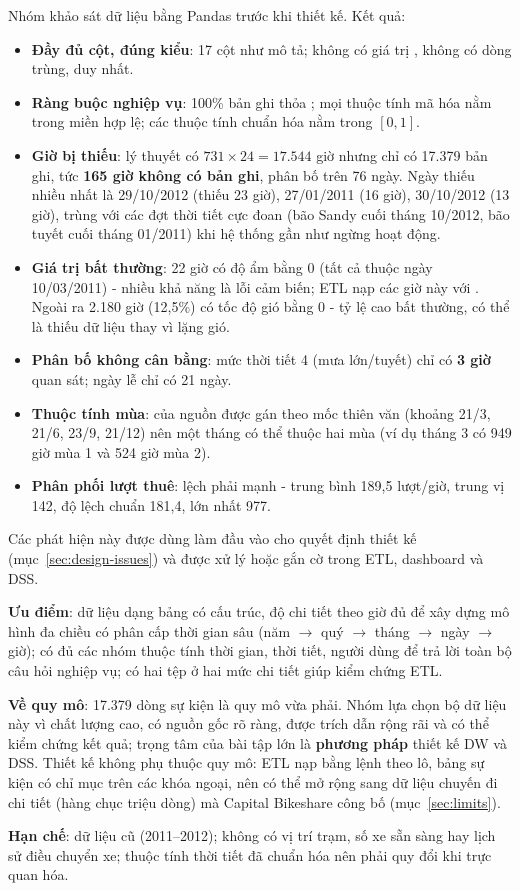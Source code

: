 \label{sec:data-quality}
Nhóm khảo sát dữ liệu bằng Pandas trước khi thiết kế. Kết quả:
\begin{itemize}
    \item \textbf{Đầy đủ cột, đúng kiểu}: 17 cột như mô tả; không có giá trị , không có dòng trùng,  duy nhất.
    \item \textbf{Ràng buộc nghiệp vụ}: 100\% bản ghi thỏa ; mọi thuộc tính mã hóa nằm trong miền hợp lệ; các thuộc tính chuẩn hóa nằm trong $[0, 1]$.
    \item \textbf{Giờ bị thiếu}: lý thuyết có $731 \times 24 = 17.544$ giờ nhưng chỉ có 17.379 bản ghi, tức \textbf{165 giờ không có bản ghi}, phân bố trên 76 ngày. Ngày thiếu nhiều nhất là 29/10/2012 (thiếu 23 giờ), 27/01/2011 (16 giờ), 30/10/2012 (13 giờ), trùng với các đợt thời tiết cực đoan (bão Sandy cuối tháng 10/2012, bão tuyết cuối tháng 01/2011) khi hệ thống gần như ngừng hoạt động.
    \item \textbf{Giá trị bất thường}: 22 giờ có độ ẩm bằng 0 (tất cả thuộc ngày 10/03/2011) - nhiều khả năng là lỗi cảm biến; ETL nạp các giờ này với . Ngoài ra 2.180 giờ (12,5\%) có tốc độ gió bằng 0 - tỷ lệ cao bất thường, có thể là thiếu dữ liệu thay vì lặng gió.
    \item \textbf{Phân bố không cân bằng}: mức thời tiết 4 (mưa lớn/tuyết) chỉ có \textbf{3 giờ} quan sát; ngày lễ chỉ có 21 ngày.
    \item \textbf{Thuộc tính mùa}:  của nguồn được gán theo mốc thiên văn (khoảng 21/3, 21/6, 23/9, 21/12) nên một tháng có thể thuộc hai mùa (ví dụ tháng 3 có 949 giờ mùa 1 và 524 giờ mùa 2).
    \item \textbf{Phân phối lượt thuê}: lệch phải mạnh - trung bình 189,5 lượt/giờ, trung vị 142, độ lệch chuẩn 181,4, lớn nhất 977.
\end{itemize}
Các phát hiện này được dùng làm đầu vào cho quyết định thiết kế (mục~\ref{sec:design-issues}) và được xử lý hoặc gắn cờ trong ETL, dashboard và DSS.

\textbf{Ưu điểm}: dữ liệu dạng bảng có cấu trúc, độ chi tiết theo giờ đủ để xây dựng mô hình đa chiều có phân cấp thời gian sâu (năm $\rightarrow$ quý $\rightarrow$ tháng $\rightarrow$ ngày $\rightarrow$ giờ); có đủ các nhóm thuộc tính thời gian, thời tiết, người dùng để trả lời toàn bộ câu hỏi nghiệp vụ; có hai tệp ở hai mức chi tiết giúp kiểm chứng ETL.

\textbf{Về quy mô}: 17.379 dòng sự kiện là quy mô vừa phải. Nhóm lựa chọn bộ dữ liệu này vì chất lượng cao, có nguồn gốc rõ ràng, được trích dẫn rộng rãi và có thể kiểm chứng kết quả; trọng tâm của bài tập lớn là \textbf{phương pháp} thiết kế DW và DSS. Thiết kế không phụ thuộc quy mô: ETL nạp bằng lệnh  theo lô, bảng sự kiện có chỉ mục trên các khóa ngoại, nên có thể mở rộng sang dữ liệu chuyến đi chi tiết (hàng chục triệu dòng) mà Capital Bikeshare công bố (mục~\ref{sec:limits}).

\textbf{Hạn chế}: dữ liệu cũ (2011--2012); không có vị trí trạm, số xe sẵn sàng hay lịch sử điều chuyển xe; thuộc tính thời tiết đã chuẩn hóa nên phải quy đổi khi trực quan hóa.
